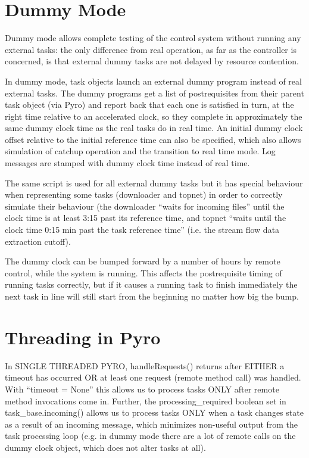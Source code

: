 \documentclass[12pt]{article}
\begin{document}
\appendix

\section{Dummy Mode}

Dummy mode allows complete testing of the control system without running
any external tasks: the only difference from real operation, as far as
the controller is concerned, is that external dummy tasks are not
delayed by resource contention. 


In dummy mode, task objects launch an external dummy program instead of
real external tasks. The dummy programs get a list of postrequisites
from their parent task object (via Pyro) and report back that each one
is satisfied in turn, at the right time relative to an accelerated
clock, so they complete in approximately the same dummy clock time as
the real tasks do in real time. An initial dummy clock offset relative
to the initial reference time can also be specified, which also allows
simulation of catchup operation and the transition to real time mode.
Log messages are stamped with dummy clock time instead of real time.

The same script is used for all external dummy tasks but it has special
behaviour when representing some tasks (downloader and topnet) in order
to correctly simulate their behaviour (the downloader ``waits for incoming
files'' until the clock time is at least 3:15 past its reference time, and
topnet ``waits until the clock time 0:15 min past the task reference
time'' (i.e. the stream flow data extraction cutoff).

The dummy clock can be bumped forward by a number of hours by remote
control, while the system is running. This affects the postrequisite
timing of running tasks correctly, but if it causes a running task to
finish immediately the next task in line will still start from the
beginning no matter how big the bump.


\section{Threading in Pyro}

In SINGLE THREADED PYRO, handleRequests() returns after EITHER a timeout has
occurred OR at least one request (remote method call) was handled.  With
``timeout = None'' this allows us to process tasks ONLY after remote method
invocations come in. Further, the processing\_required boolean set in
task\_base.incoming() allows us to process tasks ONLY when a task changes state
as a result of an incoming message, which minimizes non-useful output from the
task processing loop (e.g. in dummy mode there are a lot of remote calls on
the dummy clock object, which does not alter tasks at all). 
\end{document}
